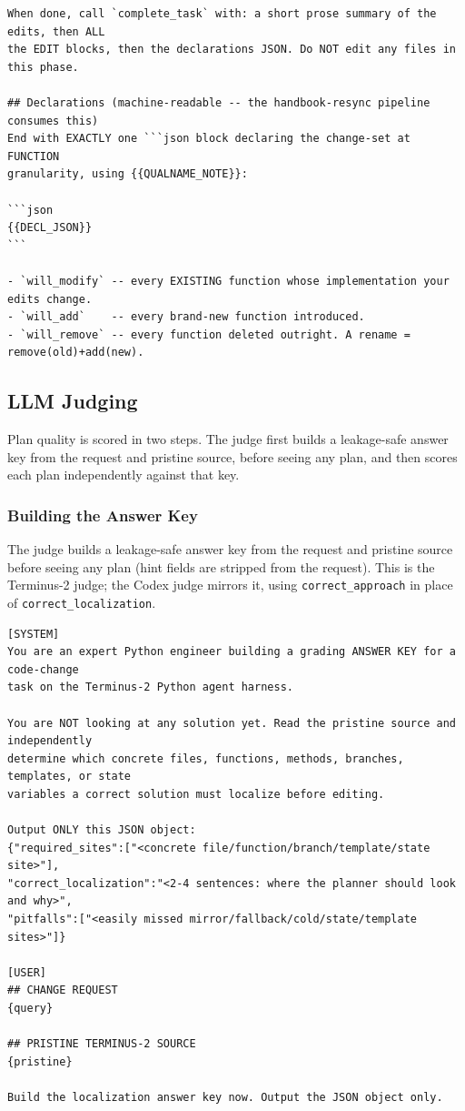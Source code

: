 \documentclass[]{ailab}
\newcommand{\code}[1]{\texttt{#1}}
\begin{document}
\begin{lstlisting}[style=promptbox]
When done, call `complete_task` with: a short prose summary of the edits, then ALL
the EDIT blocks, then the declarations JSON. Do NOT edit any files in this phase.

## Declarations (machine-readable -- the handbook-resync pipeline consumes this)
End with EXACTLY one ```json block declaring the change-set at FUNCTION
granularity, using {{QUALNAME_NOTE}}:

```json
{{DECL_JSON}}
```

- `will_modify` -- every EXISTING function whose implementation your edits change.
- `will_add`    -- every brand-new function introduced.
- `will_remove` -- every function deleted outright. A rename = remove(old)+add(new).
\end{lstlisting}

\subsection{LLM Judging}
\label{sec:d-judge}

Plan quality is scored in two steps. The judge first builds a leakage-safe answer
key from the request and pristine source, before seeing any plan, and then scores
each plan independently against that key.

\subsubsection{Building the Answer Key}

The judge builds a leakage-safe answer key from the request and pristine source
before seeing any plan (hint fields are stripped from the request). This is the
Terminus-2 judge; the Codex judge mirrors it, using \code{correct\_approach} in
place of \code{correct\_localization}.

\begin{lstlisting}[style=promptbox]
[SYSTEM]
You are an expert Python engineer building a grading ANSWER KEY for a code-change
task on the Terminus-2 Python agent harness.

You are NOT looking at any solution yet. Read the pristine source and independently
determine which concrete files, functions, methods, branches, templates, or state
variables a correct solution must localize before editing.

Output ONLY this JSON object:
{"required_sites":["<concrete file/function/branch/template/state site>"],
"correct_localization":"<2-4 sentences: where the planner should look and why>",
"pitfalls":["<easily missed mirror/fallback/cold/state/template sites>"]}

[USER]
## CHANGE REQUEST
{query}

## PRISTINE TERMINUS-2 SOURCE
{pristine}

Build the localization answer key now. Output the JSON object only.
\end{lstlisting}
\end{document}
